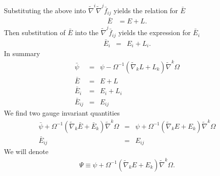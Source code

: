 \documentclass[10pt,letterpaper]{article}
\numberwithin{equation}{section}
\begin{document}
Substituting the above into $\tilde\nabla^i\tilde\nabla^j \bar f_{ij}$ yields the relation for $\bar E$
\begin{eqnarray}
\bar E &= E + L.
\end{eqnarray}
Then substitution of $\bar E$ into the $\tilde\nabla^j \bar f_{ij}$ yields the expression for $\bar E_i$
\begin{eqnarray}
\bar E_i &=& E_i + L_i.
\end{eqnarray}
In summary
\begin{eqnarray}
\bar\psi &=& \psi - \Omega^{-1}(\tilde\nabla_k L + L_k)\tilde\nabla^k \Omega
\nonumber\\
\bar E&=& E+L
\nonumber\\
\bar E_i &=& E_i + L_i
\nonumber\\
\bar E_{ij} &=& E_{ij}
\end{eqnarray}
We find two gauge invariant quantities
\begin{eqnarray}
\bar \psi + \Omega^{-1}(\tilde\nabla_k \bar E + \bar E_k)\tilde\nabla^k \Omega
&=& \psi + \Omega^{-1}(\tilde\nabla_k  E +  E_k)\tilde\nabla^k \Omega
\nonumber\\
\bar E_{ij} &=& E_{ij}
\end{eqnarray}
We will denote
\begin{eqnarray}
\Psi \equiv \psi + \Omega^{-1}(\tilde\nabla_k  E +  E_k)\tilde\nabla^k \Omega.
\label{bpsi}
\end{eqnarray}
\end{document}
